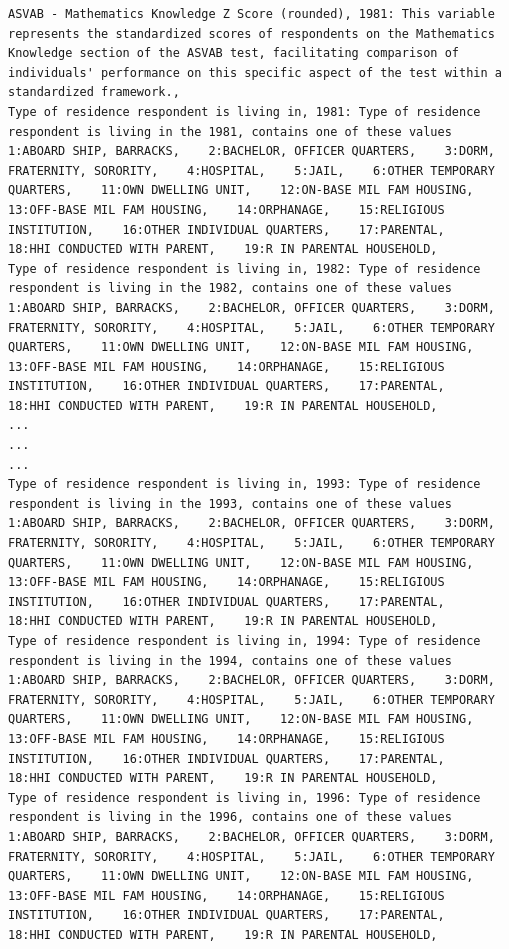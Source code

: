 \begin{verbatim}
ASVAB - Mathematics Knowledge Z Score (rounded), 1981: This variable represents the standardized scores of respondents on the Mathematics Knowledge section of the ASVAB test, facilitating comparison of individuals' performance on this specific aspect of the test within a standardized framework.,
Type of residence respondent is living in, 1981: Type of residence respondent is living in the 1981, contains one of these values 1:ABOARD SHIP, BARRACKS,    2:BACHELOR, OFFICER QUARTERS,    3:DORM, FRATERNITY, SORORITY,    4:HOSPITAL,    5:JAIL,    6:OTHER TEMPORARY QUARTERS,    11:OWN DWELLING UNIT,    12:ON-BASE MIL FAM HOUSING,    13:OFF-BASE MIL FAM HOUSING,    14:ORPHANAGE,    15:RELIGIOUS INSTITUTION,    16:OTHER INDIVIDUAL QUARTERS,    17:PARENTAL,    18:HHI CONDUCTED WITH PARENT,    19:R IN PARENTAL HOUSEHOLD,
Type of residence respondent is living in, 1982: Type of residence respondent is living in the 1982, contains one of these values 1:ABOARD SHIP, BARRACKS,    2:BACHELOR, OFFICER QUARTERS,    3:DORM, FRATERNITY, SORORITY,    4:HOSPITAL,    5:JAIL,    6:OTHER TEMPORARY QUARTERS,    11:OWN DWELLING UNIT,    12:ON-BASE MIL FAM HOUSING,    13:OFF-BASE MIL FAM HOUSING,    14:ORPHANAGE,    15:RELIGIOUS INSTITUTION,    16:OTHER INDIVIDUAL QUARTERS,    17:PARENTAL,    18:HHI CONDUCTED WITH PARENT,    19:R IN PARENTAL HOUSEHOLD,
...
...
...
Type of residence respondent is living in, 1993: Type of residence respondent is living in the 1993, contains one of these values 1:ABOARD SHIP, BARRACKS,    2:BACHELOR, OFFICER QUARTERS,    3:DORM, FRATERNITY, SORORITY,    4:HOSPITAL,    5:JAIL,    6:OTHER TEMPORARY QUARTERS,    11:OWN DWELLING UNIT,    12:ON-BASE MIL FAM HOUSING,    13:OFF-BASE MIL FAM HOUSING,    14:ORPHANAGE,    15:RELIGIOUS INSTITUTION,    16:OTHER INDIVIDUAL QUARTERS,    17:PARENTAL,    18:HHI CONDUCTED WITH PARENT,    19:R IN PARENTAL HOUSEHOLD,
Type of residence respondent is living in, 1994: Type of residence respondent is living in the 1994, contains one of these values 1:ABOARD SHIP, BARRACKS,    2:BACHELOR, OFFICER QUARTERS,    3:DORM, FRATERNITY, SORORITY,    4:HOSPITAL,    5:JAIL,    6:OTHER TEMPORARY QUARTERS,    11:OWN DWELLING UNIT,    12:ON-BASE MIL FAM HOUSING,    13:OFF-BASE MIL FAM HOUSING,    14:ORPHANAGE,    15:RELIGIOUS INSTITUTION,    16:OTHER INDIVIDUAL QUARTERS,    17:PARENTAL,    18:HHI CONDUCTED WITH PARENT,    19:R IN PARENTAL HOUSEHOLD,
Type of residence respondent is living in, 1996: Type of residence respondent is living in the 1996, contains one of these values 1:ABOARD SHIP, BARRACKS,    2:BACHELOR, OFFICER QUARTERS,    3:DORM, FRATERNITY, SORORITY,    4:HOSPITAL,    5:JAIL,    6:OTHER TEMPORARY QUARTERS,    11:OWN DWELLING UNIT,    12:ON-BASE MIL FAM HOUSING,    13:OFF-BASE MIL FAM HOUSING,    14:ORPHANAGE,    15:RELIGIOUS INSTITUTION,    16:OTHER INDIVIDUAL QUARTERS,    17:PARENTAL,    18:HHI CONDUCTED WITH PARENT,    19:R IN PARENTAL HOUSEHOLD,

\end{verbatim}
